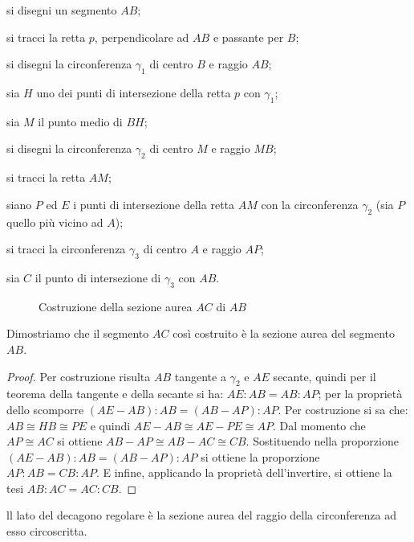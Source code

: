 \begin{enumerate*}
\item si disegni un segmento $AB$;
\item si tracci la retta $p$, perpendicolare ad $AB$ e passante per 
$B$;
\item si disegni la circonferenza $\gamma_1$ di centro $B$ e raggio 
$AB$;
\item sia $H$ uno dei punti di intersezione della retta $p$ con 
$\gamma_1$;
\item sia $M$ il punto medio di $BH$;
\item si disegni la circonferenza $\gamma_2$ di centro $M$ e raggio 
$MB$;
\item si tracci la retta $AM$;
\item siano $P$ ed $E$ i punti di intersezione della retta $AM$ con 
la circonferenza $\gamma_2$ (sia $P$ quello più vicino ad $A$);
\item si tracci la circonferenza $\gamma_3$ di centro $A$ e raggio 
$AP$;
\item sia $C$ il punto di intersezione di $\gamma_3$ con $AB$.
\end{enumerate*}


\begin{inaccessibleblock}
 \begin{figure}[!htb]
	\centering
	\caption{Costruzione della sezione aurea $AC$ di 
$AB$}\label{fig:sez_aurea2}
\end{figure}
\end{inaccessibleblock}

Dimostriamo che il segmento $AC$ così costruito è la sezione aurea 
del segmento $AB$.
\begin{proof}
Per costruzione risulta $AB$ tangente a $\gamma_2$ e $AE$ secante, 
quindi per il teorema della tangente e della secante si ha: $AE : AB 
= AB : AP$; per la proprietà dello scomporre $(AE-AB):AB=(AB-AP):AP$.
Per costruzione si sa che: $AB\cong HB\cong PE$ e quindi $AE - AB 
\cong AE - PE\cong AP$.
Dal momento che $AP\cong AC$ si ottiene $AB - AP \cong AB - AC \cong 
CB$.
Sostituendo nella proporzione $(AE-AB):AB=(AB-AP):AP$ si ottiene la 
proporzione $AP : AB = CB : AP$.
E infine, applicando la proprietà dell'invertire, si ottiene la tesi 
$AB : AC = AC : CB$.
\end{proof}

\begin{teorema}
ll lato del decagono regolare è la sezione aurea del raggio della 
circonferenza ad esso circoscritta.
\end{teorema}

